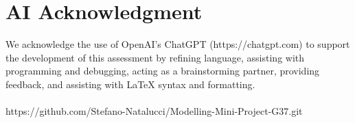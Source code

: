 \documentclass[11pt,a4paper]{article}
\begin{document}
\section*{AI Acknowledgment}

We acknowledge the use of OpenAI's ChatGPT (https://chatgpt.com) to support the development
of this assessment by refining language, assisting with programming and debugging, acting as
a brainstorming partner, providing feedback, and assisting with LaTeX syntax and formatting.\\ \\
https://github.com/Stefano-Natalucci/Modelling-Mini-Project-G37.git
\end{document}
